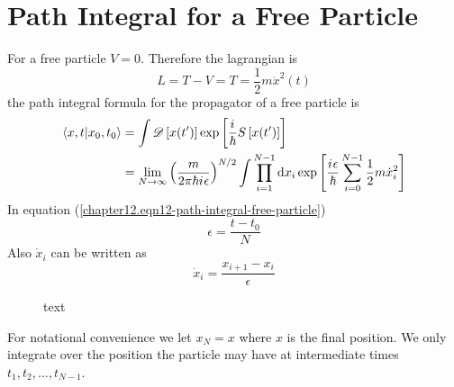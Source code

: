 	\section{Path Integral for a Free Particle}
	For a free particle $V=0$. Therefore the lagrangian is
	\begin{equation}
		L = T - V = T = \frac{1}{2} m \dot{x}^2(t)
		\label{chapter12.eqn11-path-integral-free-particle}
	\end{equation}
	the path integral formula for the propagator of a free particle is
	\begin{align}
		\braket{x, t}{x_0, t_0} 
		&= \int \mathcal{D}\left[x(t^\prime)\right] \exp\left[\frac{{i\mkern1mu}}{\hbar} S\left[x(t^\prime)\right]\right] \\
		&= \lim\limits_{N \rightarrow \infty} \left(\frac{m}{2 \pi \hbar {i\mkern1mu} \epsilon}\right)^{N/2} \int \prod_{i=1}^{N-1} \dd{x_i} \exp\left[\frac{{i\mkern1mu} \epsilon}{\hbar} \sum_{i=0}^{N-1} \frac{1}{2} m \dot{x}_i^2\right]
		\label{chapter12.eqn12-path-integral-free-particle}
	\end{align}
	In equation (\ref{chapter12.eqn12-path-integral-free-particle})
	\begin{equation}
		\epsilon = \frac{t - t_0}{N}
	\end{equation}
	Also $\dot{x}_i$ can be written as
	\begin{equation}
		\dot{x}_i = \frac{x_{i+1} - x_i}{\epsilon}
		\label{chapter12.eqn13-path-integral-free-particle}
	\end{equation}
	
	\begin{figure}
		\centering
		\caption{text}
		\label{chapter12.fig2}
	\end{figure}
	For notational convenience we let $x_N = x$ where $x$ is the final position. We only integrate over the position the particle may have at intermediate times $t_1, t_2, \ldots, t_{N-1}$.\\
	
